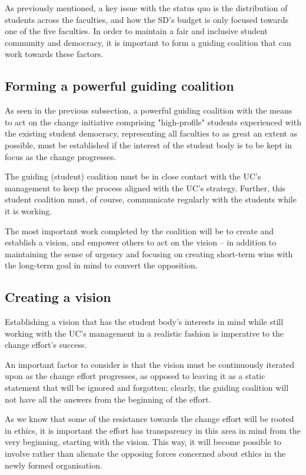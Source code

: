 As previously mentioned, a key issue with the status quo is the distribution of students across the faculties, and how the SD's budget is only focused towards one of the five faculties. In order to maintain a fair and inclusive student community and democracy, it is important to form a guiding coalition that can work towards these factors.

\subsection{Forming a powerful guiding coalition}

As seen in the previous subsection, a powerful guiding coalition with the means to act on the change initiative comprising "high-profile" students experienced with the existing student democracy, representing all faculties to as great an extent as possible, must be established if the interest of the student body is to be kept in focus as the change progresses.

The guiding (student) coalition must be in close contact with the UC's management to keep the process aligned with the UC's strategy. Further, this student coalition must, of course, communicate regularly with the students while it is working.

The most important work completed by the coalition will be to create and establish a vision, and empower others to act on the vision -- in addition to maintaining the sense of urgency and focusing on creating short-term wins with the long-term goal in mind to convert the opposition.

\subsection{Creating a vision}

Establishing a vision that has the student body's interests in mind while still working with the UC's management in a realistic fashion is imperative to the change effort's success.

An important factor to consider is that the vision must be continuously iterated upon as the change effort progresses, as opposed to leaving it as a static statement that will be ignored and forgotten; clearly, the guiding coalition will not have all the answers from the beginning of the effort.

As we know that some of the resistance towards the change effort will be rooted in ethics, it is important the effort has transparency in this area in mind from the very beginning, starting with the vision. This way, it will become possible to involve rather than alienate the opposing forces concerned about ethics in the newly formed organisation.

